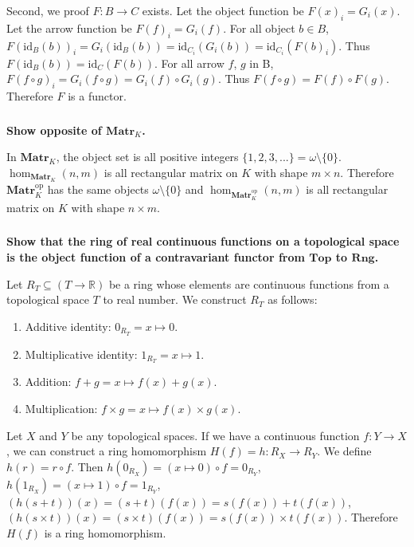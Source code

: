 \documentclass{article}
\begin{document}
Second, we proof $F : B \rightarrow C$ exists. Let the object function be $F(x)_i = G_i(x)$. Let the arrow function be $F(f)_i = G_i(f)$. For all object $b \in B$, $F(\mathrm{id}_B(b))_i = G_i(\mathrm{id}_B(b)) =  \mathrm{id}_{C_i}(G_i(b)) = \mathrm{id}_{C_i}(F(b)_i)$. Thus $F(\mathrm{id}_B(b)) = \mathrm{id}_{C}(F(b))$. For all arrow $f$, $g$ in B, $F(f \circ g)_i = G_i(f \circ g) = G_i(f) \circ G_i(g)$. Thus $F(f \circ g) = F(f) \circ F(g)$. Therefore $F$ is a functor.

\subsubsection{}

\textbf{Show opposite of $\mathbf{Matr}_K$.}

In $\mathbf{Matr}_K$, the object set is all positive integers $\{1, 2, 3, ...\} = \omega \setminus \{0\}$. $\hom_{\mathbf{Matr}_K}(n, m)$ is all rectangular matrix on $K$ with shape $m \times n$. Therefore $\mathbf{Matr}_K^{\mathrm{op}}$ has the same objects $\omega \setminus \{0\}$ and  $\hom_{\mathbf{Matr}_K^{\mathrm{op}}}(n, m)$ is all rectangular matrix on $K$ with shape $n \times m$.

\subsubsection{}

\textbf{Show that the ring of real continuous functions on a topological space is the object function of a contravariant functor from $\mathbf{Top}$ to $\mathbf{Rng}$.}

Let $R_T \subseteq (T \rightarrow \mathbb{R})$ be a ring whose elements are continuous functions from a topological space $T$ to real number. We construct $R_T$ as follows:

\begin{enumerate}
    \item Additive identity: $0_{R_T} = x \mapsto 0$.
    \item Multiplicative identity: $1_{R_T} = x \mapsto 1$.
    \item Addition: $f + g = x \mapsto f(x) + g(x)$.
    \item Multiplication: $f \times g = x \mapsto f(x) \times g(x)$.
\end{enumerate}

Let $X$ and $Y$ be any topological spaces. If we have a continuous function $f : Y \rightarrow X$, we can construct a ring homomorphism $H(f) = h : R_X \rightarrow R_Y$. We define $h(r) = r \circ f$. Then $h(0_{R_X}) = (x \mapsto 0) \circ f = 0_{R_Y}$, $h(1_{R_X}) = (x \mapsto 1) \circ f = 1_{R_Y}$, $(h(s + t))(x) = (s + t)(f(x)) = s(f(x)) + t(f(x))$, $(h(s \times t))(x) = (s \times t)(f(x)) = s(f(x)) \times t(f(x))$. Therefore $H(f)$ is a ring homomorphism.
\end{document}
